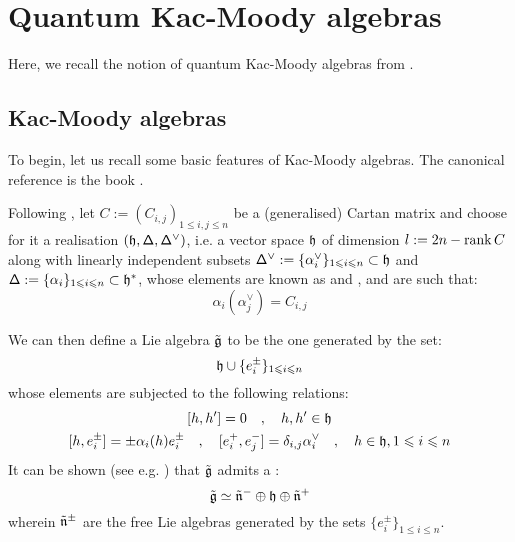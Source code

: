 \section{Quantum Kac-Moody algebras}
    Here, we recall the notion of quantum Kac-Moody algebras from \cite{etingof_kazhdan_quantisation_6}.

    \subsection{Kac-Moody algebras}
        To begin, let us recall some basic features of Kac-Moody algebras. The canonical reference is the book \cite{kac_infinite_dimensional_lie_algebras}.
        
        Following \cite[Chapter 1]{kac_infinite_dimensional_lie_algebras}, let $C := ( C_{i, j} )_{1 \leq i, j \leq n}$ be a (generalised) Cartan matrix and choose for it a realisation $(\mathfrak{h}, \mathsf{\Delta}, \mathsf{\Delta}^{\vee})$, i.e. a vector space $\mathfrak{h}$ of dimension $l := 2n - \operatorname{rank} C$ along with linearly independent subsets $\mathsf{\Delta}^{\vee} := \{ \alpha_i^{\vee} \}_{1 \leqslant i \leqslant n} \subset \mathfrak{h}$ and $\mathsf{\Delta} := \{ \alpha_i \}_{1 \leqslant i \leqslant n} \subset \mathfrak{h}^*$, whose elements are known as  and , and are such that:
            \begin{equation} \label{equation: cartan_matrix_entries}
                \alpha_i( \alpha_j^{\vee} ) = C_{i, j}
            \end{equation}

        We can then define a Lie algebra $\tilde{\mathfrak{g}}$ to be the one generated by the set:
            \begin{equation} \label{equation: kac_moody_generators}
                \mathfrak{h} \cup \{ e_i^{\pm} \}_{1 \leqslant i \leqslant n}
            \end{equation}
        whose elements are subjected to the following relations:
            \begin{equation} \label{equation: extended_kac_moody_relations}
                \begin{gathered}
                    [h, h'] = 0 \quad, \quad h, h' \in \h
                    \\
                    [h, e_i^{\pm}] = \pm \alpha_i(h) e_i^{\pm} \quad, \quad [e_i^+, e_j^-] = \delta_{i, j} \alpha_i^{\vee} \quad, \quad h \in \h, 1 \leq i \leq n
                \end{gathered}
            \end{equation}
        It can be shown (see e.g. \cite[Theorem 1.2]{kac_infinite_dimensional_lie_algebras}) that $\tilde{\mathfrak{g}}$ admits a :
            $$\tilde{\mathfrak{g}} \simeq \tilde{\mathfrak{n}}^- \oplus \mathfrak{h} \oplus \tilde{\mathfrak{n}}^+$$
        wherein $\tilde{\mathfrak{n}}^{\pm}$ are the free Lie algebras generated by the sets $\{ e_i^{\pm} \}_{1 \leq i \leq n}$.
            
